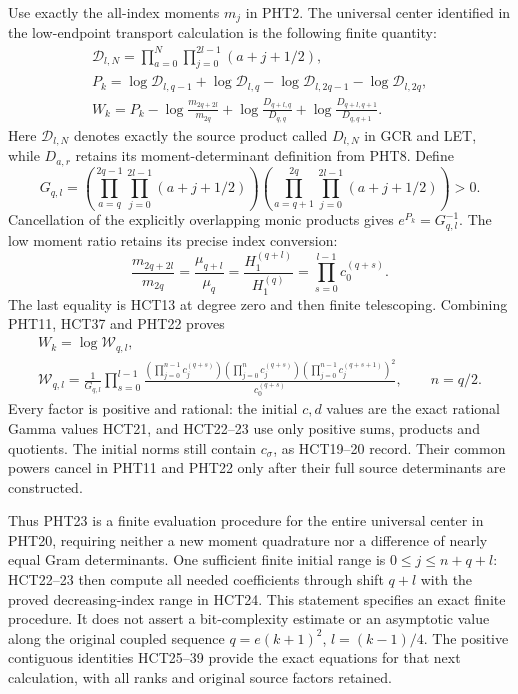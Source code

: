 Use exactly the all-index moments $m_j$ in PHT2. The universal
center identified in the low-endpoint transport calculation is
the following finite quantity:
\[
\begin{gathered}
 \mathscr D_{l,N}=\prod_{a=0}^N\prod_{j=0}^{2l-1}(a+j+1/2),\\
 P_k=\log\mathscr D_{l,q-1}+\log\mathscr D_{l,q}
             -\log\mathscr D_{l,2q-1}-\log\mathscr D_{l,2q},\\
 W_k=P_k-\log\frac{m_{2q+2l}}{m_{2q}}
     +\log\frac{D_{q+l,q}}{D_{q,q}}
     +\log\frac{D_{q+l,q+1}}{D_{q,q+1}}.
\end{gathered}\tag{PHT20}
\]
Here $\mathscr D_{l,N}$ denotes exactly the source product
called $D_{l,N}$ in GCR and LET, while $D_{a,r}$ retains
its moment-determinant definition from PHT8. Define
\[
 G_{q,l}=
 \left(\prod_{a=q}^{2q-1}\prod_{j=0}^{2l-1}(a+j+1/2)\right)
 \left(\prod_{a=q+1}^{2q}\prod_{j=0}^{2l-1}(a+j+1/2)\right)>0.
\tag{PHT21}
\]
Cancellation of the explicitly overlapping monic products
gives $e^{P_k}=G_{q,l}^{-1}$. The low moment ratio retains
its precise index conversion:
\[
 \frac{m_{2q+2l}}{m_{2q}}
 =\frac{\mu_{q+l}}{\mu_q}
 =\frac{H_1^{(q+l)}}{H_1^{(q)}}
 =\prod_{s=0}^{l-1}c_0^{(q+s)}.
\tag{PHT22}
\]
The last equality is HCT13 at degree zero and then finite
telescoping. Combining PHT11, HCT37 and PHT22 proves
\[
\begin{gathered}
 W_k=\log\mathcal W_{q,l},\\
 \boxed{\mathcal W_{q,l}=
 \frac1{G_{q,l}}\prod_{s=0}^{l-1}
 \frac{\displaystyle
   \left(\prod_{j=0}^{n-1}c_j^{(q+s)}\right)
   \left(\prod_{j=0}^{n}c_j^{(q+s)}\right)
   \left(\prod_{j=0}^{n-1}c_j^{(q+s+1)}\right)^2}
 {c_0^{(q+s)}},\qquad n=q/2.}
\end{gathered}\tag{PHT23}
\]
Every factor is positive and rational: the initial $c,d$
values are the exact rational Gamma values HCT21, and
HCT22--23 use only positive sums, products and quotients.
The initial norms still contain $c_\sigma$, as HCT19--20
record. Their common powers cancel in PHT11 and PHT22
only after their full source determinants are constructed.

Thus PHT23 is a finite evaluation procedure for the entire
universal center in PHT20, requiring neither a new moment
quadrature nor a difference of nearly equal Gram determinants.
One sufficient finite initial range is $0\leq j\leq n+q+l$:
HCT22--23 then compute all needed coefficients through shift
$q+l$ with the proved decreasing-index range in HCT24.
This statement specifies an exact finite procedure. It does
not assert a bit-complexity estimate or an asymptotic value
along the original coupled sequence $q=e(k+1)^2$, $l=(k-1)/4$.
The positive contiguous identities HCT25--39 provide the
exact equations for that next calculation, with all ranks
and original source factors retained.

